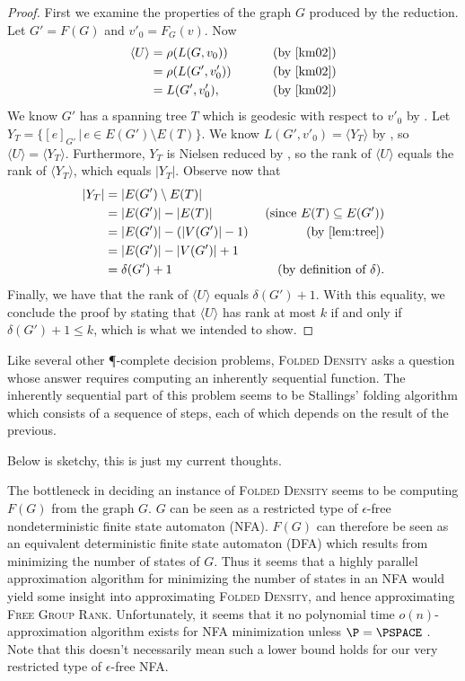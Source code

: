 \documentclass{article}
\newcommand{\FGR}{\textsc{Free Group Rank}}
\newcommand{\FD}{\textsc{Folded Density}}
\newcommand{\gen}[1]{\langle #1 \rangle}
\begin{document}
\begin{proof}
  First we examine the properties of the graph $G$ produced by the reduction.
  Let $G' = F(G)$ and $v'_0 = F_G(v)$.
  Now
  \begin{align*}
    \gen{U} & = \rho(L(G, v_0)) & \qquad \text{ (by \cite[Proposition~3.8]{km02})} \\
            & = \rho(L(G', v'_0)) & \qquad \text{ (by \cite[Lemma~3.4]{km02})} \\
            & = L(G', v'_0), & \qquad \text{ (by \cite[Lemma~2.9]{km02})}
  \end{align*}
  We know $G'$ has a spanning tree $T$ which is geodesic with respect to $v'_0$ by \cite[Lemma~6.6]{km02}.
  Let $Y_T = \{[e]_{G'} \, | \, e \in E(G') \setminus E(T) \}$.
  We know $L(G', v'_0) = \gen{Y_T}$ by \cite[Lemma~6.1]{km02}, so $\gen{U} = \gen{Y_T}$.
  Furthermore, $Y_T$ is Nielsen reduced by \cite[Proposition~6.7]{km02}, so the rank of $\gen{U}$ equals the rank of $\gen{Y_T}$, which equals $|Y_T|$.
  Observe now that
  \begin{align*}
    |Y_T| & = |E(G') \setminus E(T)| & \\
          & = |E(G')| - |E(T)| & \text{ (since } E(T) \subseteq E(G') \text{)} \\
          & = |E(G')| - (|V(G')| - 1) & \text{ (by \autoref{lem:tree})} \\
          & = |E(G')| - |V(G')| + 1 & \\
          & = \delta(G') + 1 & \text{ (by definition of } \delta \text{)}.
  \end{align*}
  Finally, we have that the rank of $\gen{U}$ equals $\delta(G') + 1$.
  With this equality, we conclude the proof by stating that $\gen{U}$ has rank at most $k$ if and only if $\delta(G') + 1 \leq k$, which is what we intended to show.
\end{proof}

Like several other \P-complete decision problems, \FD{} asks a question whose answer requires computing an inherently sequential function.
The inherently sequential part of this problem seems to be Stallings' folding algorithm which consists of a sequence of steps, each of which depends on the result of the previous.

\begin{todo}
  Below is sketchy, this is just my current thoughts.

  The bottleneck in deciding an instance of \FD{} seems to be computing $F(G)$ from the graph $G$.
  $G$ can be seen as a restricted type of $\epsilon$-free nondeterministic finite state automaton (NFA).
  $F(G)$ can therefore be seen as an equivalent deterministic finite state automaton (DFA) which results from minimizing the number of states of $G$.
  Thus it seems that a highly parallel approximation algorithm for minimizing the number of states in an NFA would yield some insight into approximating \FD, and hence approximating \FGR.
  Unfortunately, it seems that it no polynomial time $o(n)$-approximation algorithm exists for NFA minimization unless $\P = \PSPACE$ \cite[Theorem~4]{gs05}.
  Note that this doesn't necessarily mean such a lower bound holds for our very restricted type of $\epsilon$-free NFA.
\end{todo}
\end{document}
